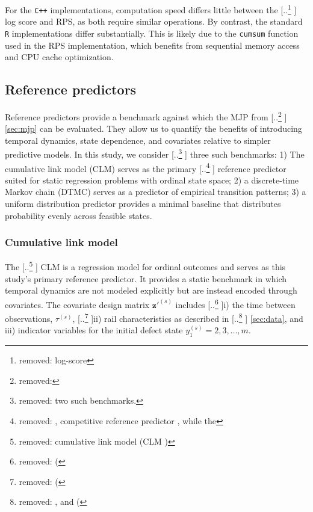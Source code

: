 \documentclass{article}
\providecommand{\DIFadd}[1]{{\protect\color{blue} \sf #1}} %
\providecommand{\DIFdel}[1]{{\protect\color{red} [..\footnote{removed: #1} ]}} %
\providecommand{\DIFaddbegin}{} %
\providecommand{\DIFaddend}{} %
\providecommand{\DIFdelbegin}{} %
\providecommand{\DIFdelend}{} %
\begin{document}
For the \texttt{C++} implementations, computation speed differs little between the \DIFdelbegin \DIFdel{log-score }\DIFdelend \DIFaddbegin \DIFadd{log score }\DIFaddend and RPS, as both require similar operations. By contrast, the standard \texttt{R} implementations differ substantially. This is likely due to the \texttt{cumsum} function used in the RPS implementation, which benefits from sequential memory access and CPU cache optimization.





\subsection{Reference predictors} \label{sec:reference_forecasts}
Reference predictors provide a benchmark against which the MJP from \DIFdelbegin \DIFdel{ }\DIFdelend \DIFaddbegin \DIFadd{\cref{sec:mjp} }\DIFaddend can be evaluated. They allow us to quantify the benefits of introducing temporal dynamics, state dependence, and covariates relative to simpler predictive models.
In this study, we consider \DIFdelbegin \DIFdel{two such benchmarks. }\DIFdelend \DIFaddbegin \DIFadd{three such benchmarks: 1) }\DIFaddend The cumulative link model (CLM) serves as the primary \DIFdelbegin \DIFdel{, competitive reference predictor , while the }\DIFdelend \DIFaddbegin \DIFadd{reference predictor suited for static regression problems with ordinal state space; 
2) a discrete-time Markov chain (DTMC) serves as a predictor of empirical transition patterns; 
3) a }\DIFaddend uniform distribution predictor provides a minimal baseline that distributes probability evenly across feasible states.

\subsubsection{Cumulative link model} \label{sec:cumulative_link_model}

The \DIFdelbegin \DIFdel{cumulative link model (CLM ) }\DIFdelend \DIFaddbegin \DIFadd{CLM }\DIFaddend is a regression model for ordinal outcomes and serves as this study's primary reference predictor. It provides a static benchmark in which temporal dynamics are not modeled explicitly but are instead encoded through covariates. The covariate design matrix $\bm{z}'^{(s)}$ includes \DIFdelbegin \DIFdel{(}\DIFdelend i) the time between observations, $\tau^{(s)}$, \DIFdelbegin \DIFdel{(}\DIFdelend ii) rail characteristics as described in \DIFdelbegin \DIFdel{, and (}\DIFdelend \DIFaddbegin \DIFadd{\cref{sec:data}, and }\DIFaddend iii) indicator variables for the initial defect state $y_1^{(s)} =2,3,\dots,m$. 
\end{document}
